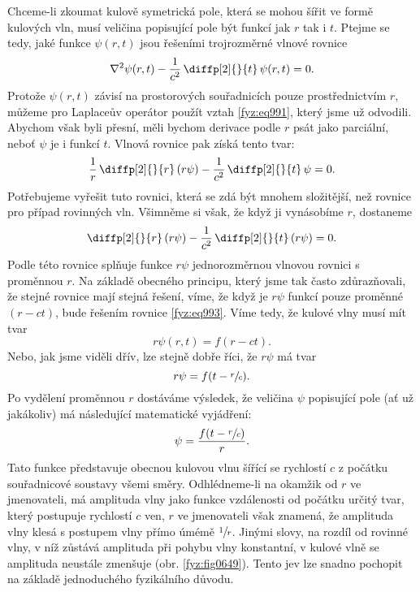     Chceme-li zkoumat kulově symetrická pole, která se mohou šířit ve formě kulových vln, musí
    veličina popisující pole být funkcí jak \(r\) tak i \(t\). Ptejme se tedy, jaké funkce \(\psi(r,
    t)\) jsou řešeními trojrozměrné vlnové rovnice
    \begin{equation}\label{fyz:eq992}
      \nabla^2\psi(r,t)-\dfrac{1}{c^2}\,\diffp[2]{ }{t}\,\psi(r,t)=0.
    \end{equation}
    Protože \(\psi(r, t)\) závisí na prostorových souřadnicích pouze prostřednictvím \(r\), můžeme
    pro Laplaceův operátor použít vztah \eqref{fyz:eq991}, který jsme už odvodili. Abychom však byli
    přesní, měli bychom derivace podle \(r\) psát jako parciální, neboť \(\psi\) je i funkcí \(t\).
    Vlnová rovnice pak získá tento tvar:
    \begin{equation*}
      \frac{1}{r}\,\diffp[2]{ }{r}\,(r\psi) - \dfrac{1}{c^2}\,\diffp[2]{ }{t}\,\psi=0.
    \end{equation*}
    Potřebujeme vyřešit tuto rovnici, která se zdá být mnohem složitější, než rovnice pro případ
    rovinných vln. Všimněme si však, že když ji vynásobíme \(r\), dostaneme
    \begin{equation}\label{fyz:eq993}
      \diffp[2]{ }{r}\,(r\psi) - \dfrac{1}{c^2}\,\diffp[2]{ }{t}\,(r\psi)=0.
    \end{equation}
    Podle této rovnice splňuje funkce \(r\psi\) jednorozměrnou vlnovou rovnici s proměnnou \(r\). Na
    základě obecného principu, který jsme tak často zdůrazňovali, že stejné rovnice mají stejná
    řešení, víme, že když je \(r\psi\)  funkcí pouze proměnné \((r - ct)\), bude řešením rovnice
    \eqref{fyz:eq993}. Víme tedy, že kulové vlny musí mít tvar
    \begin{equation*}
      r\psi(r,t)=f(r-ct).
    \end{equation*}
    Nebo, jak jsme viděli dřív, lze stejně dobře říci, že \(r\psi\) má tvar
    \begin{equation*}
      r\psi=f(t-\sfrac{r}{c}).
    \end{equation*}
    Po vydělení proměnnou \(r\) dostáváme výsledek, že veličina \(\psi\) popisující pole (ať už
    jakákoliv) má následující matematické vyjádření:
    \begin{equation}\label{fyz:eq994}
      \psi=\dfrac{f(t-\sfrac{r}{c})}{r}.
    \end{equation}
    Tato funkce představuje obecnou kulovou vlnu šířící se rychlostí \(c\) z počátku souřadnicové
    soustavy všemi směry. Odhlédneme-li na okamžik od \(r\) ve jmenovateli, má amplituda vlny jako
    funkce vzdálenosti od počátku určitý tvar, který postupuje rychlostí \(c\) ven, \(r\) ve
    jmenovateli však znamená, že amplituda vlny klesá s postupem vlny přímo úmémě \(\sfrac{1}{r}\).
    Jinými slovy, na rozdíl od rovinné vlny, v níž zůstává amplituda při pohybu vlny konstantní, v
    kulové vlně se amplituda neustále zmenšuje (obr. \ref{fyz:fig0649}). Tento jev lze snadno
    pochopit na základě jednoduchého fyzikálního důvodu.

